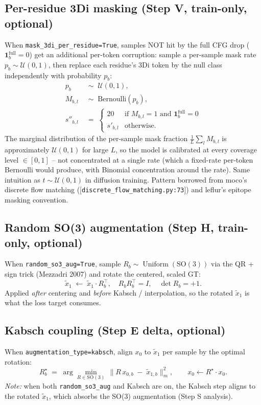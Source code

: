 \documentclass[11pt]{article}
\begin{document}
\subsection{Per-residue 3Di masking (Step V, train-only, optional)}
When \texttt{mask\_3di\_per\_residue=True}, samples NOT hit by the full CFG drop ($\mathbf{1}^{\text{full}}_b = 0$) get an additional per-token corruption: sample a per-sample mask rate $p_b \sim \mathcal{U}(0, 1)$, then replace each residue's 3Di token by the null class independently with probability $p_b$:
\begin{align}
p_b &\;\sim\; \mathcal{U}(0, 1), \\
M_{b,l} &\;\sim\; \mathrm{Bernoulli}(p_b), \\
s''_{b,l} &\;=\; \begin{cases} 20 & \text{if } M_{b,l} = 1 \text{ and } \mathbf{1}^{\text{full}}_b = 0 \\ s'_{b,l} & \text{otherwise.} \end{cases}
\end{align}
The marginal distribution of the per-sample mask fraction $\frac{1}{L}\sum_l M_{b,l}$ is approximately $\mathcal{U}(0, 1)$ for large $L$, so the model is calibrated at every coverage level $\in [0, 1]$ -- not concentrated at a single rate (which a fixed-rate per-token Bernoulli would produce, with Binomial concentration around the rate). Same intuition as $t \sim \mathcal{U}(0, 1)$ in diffusion training. Pattern borrowed from moco's discrete flow matching ([\texttt{discrete\_flow\_matching.py:73}]) and leflur's epitope masking convention.

\subsection{Random SO(3) augmentation (Step H, train-only, optional)}
When \texttt{random\_so3\_aug=True}, sample $R_b \sim \operatorname{Uniform}(\mathrm{SO}(3))$ via the QR + sign trick (Mezzadri 2007) and rotate the centered, scaled GT:
\begin{equation}
\tilde x_1 \;\leftarrow\; \tilde x_1 \cdot R_b^\top, \quad R_b R_b^\top = I, \quad \det R_b = +1.
\end{equation}
Applied \emph{after} centering and \emph{before} Kabsch / interpolation, so the rotated $\tilde x_1$ is what the loss target consumes.

\subsection{Kabsch coupling (Step E delta, optional)}
When \texttt{augmentation\_type=kabsch}, align $x_0$ to $\tilde x_1$ per sample by the optimal rotation:
\begin{equation}
R^\star_b \;=\; \arg\min_{R \in \mathrm{SO}(3)} \, \|R\, x_{0,b} \;-\; \tilde x_{1,b}\|_m^2, \qquad x_0 \leftarrow R^\star \cdot x_0.
\end{equation}
\emph{Note:} when both \texttt{random\_so3\_aug} and Kabsch are on, the Kabsch step aligns to the rotated $\tilde x_1$, which absorbs the SO(3) augmentation (Step S analysis).
\end{document}

